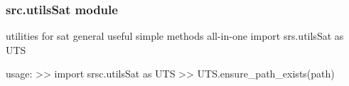 \documentclass[a4paper,10pt,english]{sphinxmanual}
\begin{document}

\begin{fulllineitems}
\label{\detokenize{apidoc_src/src:src.test_module.getTmpDirDEFAULT}}
\end{fulllineitems}



\subsubsection{src.utilsSat module}
\label{\detokenize{apidoc_src/src:src-utilssat-module}}\label{\detokenize{apidoc_src/src:module-src.utilsSat}}
utilities for sat
general useful simple methods
all-in-one import srs.utilsSat as UTS

usage:
\textgreater{}\textgreater{} import srsc.utilsSat as UTS
\textgreater{}\textgreater{} UTS.ensure\_path\_exists(path)
\end{document}
